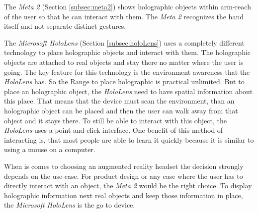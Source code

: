 \documentclass[11pt, a4paper]{IEEEtran}
\begin{document}
The \textit{Meta 2} (Section \ref{subsec:meta2}) shows holographic objects within arm-reach of the user so that he can interact with them. The \textit{Meta 2} recognizes the hand itself and not separate distinct gestures. 

The \textit{Microsoft HoloLens} (Section \ref{subsec:holoLens}) uses a completely different technology to place holographic objects and interact with them. The holographic objects are attached to real objects and stay there no matter where the user is going. The key feature for this technology is the environment awareness that the \textit{HoloLens} has. So the Range to place holographic is practical unlimited. But to place an holographic object, the \textit{HoloLens} need to have spatial information about this place. That means that the device must scan the environment, than an holographic object can be placed and then the user can walk away from that object and it stays there. To still be able to interact with this object, the \textit{HoloLens} uses a point-and-click interface. One benefit of this method of interacting is, that most people are able to learn it quickly because it is similar to using a mouse on a computer.

When is comes to choosing an augmented reality headset the decision strongly depends on the use-case. For product design or any case where the user has to directly interact with an object, the \textit{Meta 2} would be the right choice. To display holographic information next real objects and keep those information in place, the \textit{Microsoft HoloLens} is the go to device.




\end{document}

